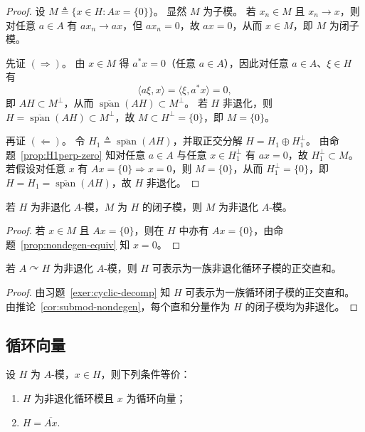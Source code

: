 \documentclass[lang=cn,a4paper,newtx,section]{elegantbook}
\begin{document}
\begin{proof}
  设 $M\triangleq\{x\in H:Ax=\{0\}\}$。
  显然 $M$ 为子模。
  若 $x_{n}\in M$ 且 $x_{n}\to x$，则对任意 $a\in A$ 有 $ax_{n}\to ax$，但 $ax_{n}=0$，故 $ax=0$，从而 $x\in M$，即 $M$ 为闭子模。

  先证 $(\Rightarrow)$。
  由 $x\in M$ 得 $a^{*}x=0$（任意 $a\in A$），因此对任意 $a\in A$、$\xi\in H$ 有
  \[
    \langle a\xi,x\rangle=\langle \xi,a^{*}x\rangle=0,
  \]
  即 $AH\subset M^{\perp}$，从而 $\overline{\operatorname{span}}(AH)\subset M^{\perp}$。
  若 $H$ 非退化，则 $H=\overline{\operatorname{span}}(AH)\subset M^{\perp}$，故 $M\subset H^{\perp}=\{0\}$，即 $M=\{0\}$。

  再证 $(\Leftarrow)$。
  令 $H_{1}\triangleq\overline{\operatorname{span}}(AH)$，并取正交分解 $H=H_{1}\oplus H_{1}^{\perp}$。
  由命题~\ref{prop:H1perp-zero} 知对任意 $a\in A$ 与任意 $x\in H_{1}^{\perp}$ 有 $ax=0$，故 $H_{1}^{\perp}\subset M$。
  若假设对任意 $x$ 有 $Ax=\{0\}\Rightarrow x=0$，则 $M=\{0\}$，从而 $H_{1}^{\perp}=\{0\}$，即 $H=H_{1}=\overline{\operatorname{span}}(AH)$，故 $H$ 非退化。
\end{proof}

\begin{corollary}\label{cor:submod-nondegen}
  若 $H$ 为非退化 $A$-模，$M$ 为 $H$ 的闭子模，则 $M$ 为非退化 $A$-模。
\end{corollary}

\begin{proof}
  若 $x\in M$ 且 $Ax=\{0\}$，则在 $H$ 中亦有 $Ax=\{0\}$，由命题~\ref{prop:nondegen-equiv} 知 $x=0$。
\end{proof}

\begin{theorem}
  若 $A\curvearrowright H$ 为非退化 $A$-模，则 $H$ 可表示为一族非退化循环子模的正交直和。
\end{theorem}

\begin{proof}
  由习题~\ref{exer:cyclic-decomp} 知 $H$ 可表示为一族循环闭子模的正交直和。
  由推论~\ref{cor:submod-nondegen}，每个直和分量作为 $H$ 的闭子模均为非退化。
\end{proof}

\subsection{循环向量}

\begin{theorem}
  设 $H$ 为 $A$-模，$x\in H$，则下列条件等价：
  \begin{enumerate}
    \item $H$ 为非退化循环模且 $x$ 为循环向量；
    \item $H=\overline{Ax}$.
  \end{enumerate}
\end{theorem}
\end{document}

